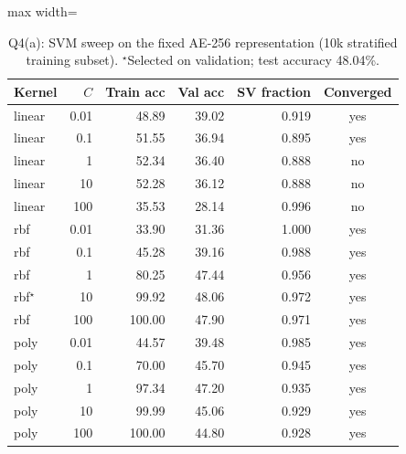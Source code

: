 \begin{table}[t]\centering\footnotesize\setlength{\tabcolsep}{3pt}
\begin{adjustbox}{max width=\columnwidth}
\begin{tabular}{lrrrrc}\toprule
Kernel & $C$ & Train acc & Val acc & SV fraction & Converged \\\midrule
linear & 0.01 & 48.89 & 39.02 & 0.919 & yes \\
linear & 0.1 & 51.55 & 36.94 & 0.895 & yes \\
linear & 1 & 52.34 & 36.40 & 0.888 & no \\
linear & 10 & 52.28 & 36.12 & 0.888 & no \\
linear & 100 & 35.53 & 28.14 & 0.996 & no \\
rbf & 0.01 & 33.90 & 31.36 & 1.000 & yes \\
rbf & 0.1 & 45.28 & 39.16 & 0.988 & yes \\
rbf & 1 & 80.25 & 47.44 & 0.956 & yes \\
rbf$^\star$ & 10 & 99.92 & 48.06 & 0.972 & yes \\
rbf & 100 & 100.00 & 47.90 & 0.971 & yes \\
poly & 0.01 & 44.57 & 39.48 & 0.985 & yes \\
poly & 0.1 & 70.00 & 45.70 & 0.945 & yes \\
poly & 1 & 97.34 & 47.20 & 0.935 & yes \\
poly & 10 & 99.99 & 45.06 & 0.929 & yes \\
poly & 100 & 100.00 & 44.80 & 0.928 & yes \\
\bottomrule\end{tabular}
\end{adjustbox}
\caption{Q4(a): SVM sweep on the fixed AE-256 representation (10k stratified training subset). $^\star$Selected on validation; test accuracy 48.04\%.}\label{tab:q4a}\end{table}
